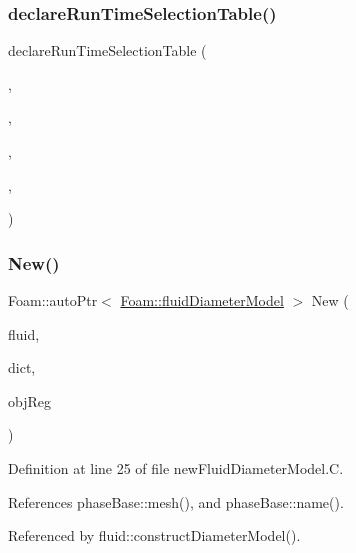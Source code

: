 \subsubsection{\texorpdfstring{declare\+Run\+Time\+Selection\+Table()}{declareRunTimeSelectionTable()}}
{\footnotesize\ttfamily declare\+Run\+Time\+Selection\+Table (\begin{DoxyParamCaption}\item[{auto\+Ptr}]{,  }\item[{\hyperlink{classFoam_1_1fluidDiameterModel}{fluid\+Diameter\+Model}}]{,  }\item[{fluid\+Diameter\+Models}]{,  }\item[{(const \hyperlink{classFoam_1_1FSPair}{F\+S\+Pair} \&pair, const dictionary \&dict, const object\+Registry \&obj\+Reg)}]{,  }\item[{(pair, dict, obj\+Reg)}]{ }\end{DoxyParamCaption})}

\mbox{\label{classFoam_1_1fluidDiameterModel_a6f22fb248e45888d4afe527f6e17e593}} 
\subsubsection{\texorpdfstring{New()}{New()}\hspace{0.1cm}{\footnotesize\ttfamily [1/2]}}
{\footnotesize\ttfamily Foam\+::auto\+Ptr$<$ \hyperlink{classFoam_1_1fluidDiameterModel}{Foam\+::fluid\+Diameter\+Model} $>$ New (\begin{DoxyParamCaption}\item[{const \hyperlink{classFoam_1_1fluid}{fluid} \&}]{fluid,  }\item[{const dictionary \&}]{dict,  }\item[{const object\+Registry \&}]{obj\+Reg }\end{DoxyParamCaption})\hspace{0.3cm}{\ttfamily [static]}}



Definition at line 25 of file new\+Fluid\+Diameter\+Model.\+C.



References phase\+Base\+::mesh(), and phase\+Base\+::name().



Referenced by fluid\+::construct\+Diameter\+Model().

